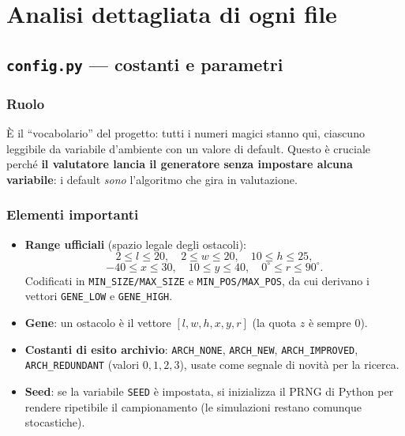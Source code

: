\documentclass[11pt,a4paper]{report}
\newcommand{\code}[1]{\texttt{#1}}
\begin{document}
\chapter{Analisi dettagliata di ogni file}

\section{\texttt{config.py} --- costanti e parametri}
\label{sec:config}

\subsection{Ruolo}
È il ``vocabolario'' del progetto: tutti i numeri magici stanno qui,
ciascuno leggibile da variabile d'ambiente con un valore di default.
Questo è cruciale perché \textbf{il valutatore lancia il generatore
senza impostare alcuna variabile}: i default \emph{sono} l'algoritmo che
gira in valutazione.

\subsection{Elementi importanti}
\begin{itemize}
  \item \textbf{Range ufficiali} (spazio legale degli ostacoli):
  \[
  2\le l\le 20,\quad 2\le w\le 20,\quad 10\le h\le 25,
  \]
  \[
  -40\le x\le 30,\quad 10\le y\le 40,\quad 0^\circ\le r\le 90^\circ.
  \]
  Codificati in \code{MIN\_SIZE/MAX\_SIZE} e \code{MIN\_POS/MAX\_POS}, da
  cui derivano i vettori \code{GENE\_LOW} e \code{GENE\_HIGH}.
  \item \textbf{Gene}: un ostacolo è il vettore
  $[l,w,h,x,y,r]$ (la quota $z$ è sempre $0$).
  \item \textbf{Costanti di esito archivio}: \code{ARCH\_NONE},
  \code{ARCH\_NEW}, \code{ARCH\_IMPROVED}, \code{ARCH\_REDUNDANT}
  (valori $0,1,2,3$), usate come segnale di novità per la ricerca.
  \item \textbf{Seed}: se la variabile \code{SEED} è impostata, si
  inizializza il PRNG di Python per rendere ripetibile il campionamento
  (le simulazioni restano comunque stocastiche).
\end{itemize}
\end{document}

